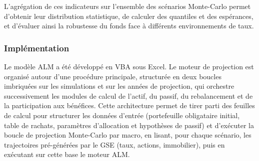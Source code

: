 L'agrégation de ces indicateurs sur l'ensemble des scénarios Monte-Carlo permet d'obtenir leur distribution statistique, de calculer des quantiles et des espérances, et d'évaluer ainsi la robustesse du fonds face à différents environnements de taux.

\subsubsection{Implémentation}

Le modèle ALM a été développé en VBA sous Excel. Le moteur de projection est organisé autour d'une procédure principale, structurée en deux boucles imbriquées sur les simulations et sur les années de projection, qui orchestre successivement les modules de calcul de l'actif, du passif, du rebalancement et de la participation aux bénéfices. Cette architecture permet de tirer parti des feuilles de calcul pour structurer les données d'entrée (portefeuille obligataire initial, table de rachats, paramètres d'allocation et hypothèses de passif) et d'exécuter la boucle de projection Monte-Carlo par macro, en lisant, pour chaque scénario, les trajectoires pré-générées par le GSE (taux, actions, immobilier), puis en exécutant sur cette base le moteur ALM.
